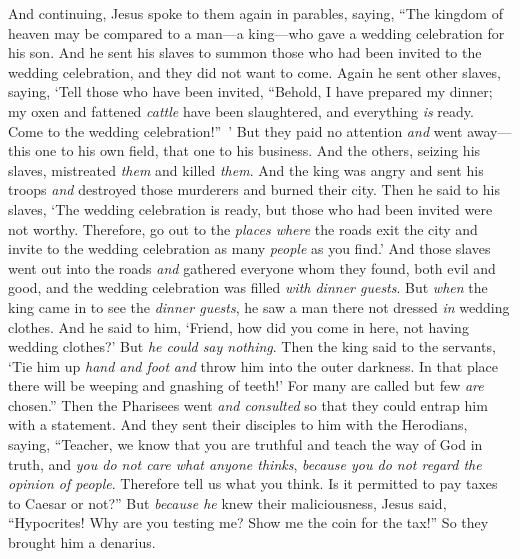 \begin{biblechapter} %
 And continuing, Jesus spoke to them again in parables, saying,
\verse “The kingdom of heaven may be compared to a man—a king—who gave a wedding celebration for his son.
\verse And he sent his slaves to summon those who had been invited to the wedding celebration, and they did not want to come.
\verse Again he sent other slaves, saying, ‘Tell those who have been invited, “Behold, I have prepared my dinner; my oxen and fattened \textit{cattle} have been slaughtered, and everything \textit{is} ready. Come to the wedding celebration!” ’
\verse But they paid no attention \textit{and} went away—this one to his own field, that one to his business.
\verse And the others, seizing his slaves, mistreated \textit{them} and killed \textit{them}.
\verse And the king was angry and sent his troops \textit{and} destroyed those murderers and burned their city.
\verse Then he said to his slaves, ‘The wedding celebration is ready, but those who had been invited were not worthy.
\verse Therefore, go out to the \textit{places where} the roads exit the city and invite to the wedding celebration as many \textit{people} as you find.’
\verse And those slaves went out into the roads \textit{and} gathered everyone whom they found, both evil and good, and the wedding celebration was filled \textit{with dinner guests}.
\verse But \textit{when} the king came in to see the \textit{dinner guests}, he saw a man there not dressed \textit{in} wedding clothes.
\verse And he said to him, ‘Friend, how did you come in here, not having wedding clothes?’ But \textit{he could say nothing}.
\verse Then the king said to the servants, ‘Tie him up \textit{hand and foot} \textit{and} throw him into the outer darkness. In that place there will be weeping and gnashing of teeth!’
\verse For many are called but few \textit{are} chosen.”
 Then the Pharisees went \textit{and consulted} so that they could entrap him with a statement.
\verse And they sent their disciples to him with the Herodians, saying, “Teacher, we know that you are truthful and teach the way of God in truth, and \textit{you do not care what anyone thinks}, \textit{because you do not regard the opinion of people}.
\verse Therefore tell us what you think. Is it permitted to pay taxes to Caesar or not?”
\verse But \textit{because he} knew their maliciousness, Jesus said, “Hypocrites! Why are you testing me?
\verse Show me the coin for the tax!” So they brought him a denarius.

\end{biblechapter}
